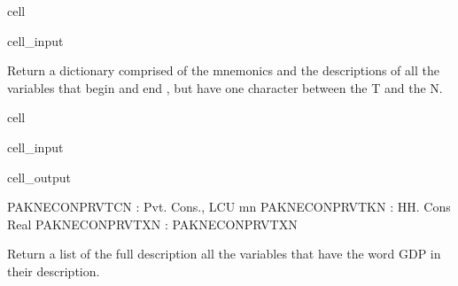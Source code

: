 \documentclass[letterpaper,10pt,english]{jupyterBook}
\begin{document}
\begin{sphinxuseclass}{cell}
\begin{sphinxVerbatimInput}
\begin{sphinxuseclass}{cell_input}
\begin{sphinxVerbatim}[commandchars=\\\{\}]


\end{sphinxVerbatim}

\end{sphinxuseclass}\end{sphinxVerbatimInput}

\end{sphinxuseclass}
\sphinxAtStartPar
Return a dictionary comprised of the mnemonics and the descriptions of all the variables that begin  and end , but have one character between the T and the N.

\begin{sphinxuseclass}{cell}\begin{sphinxVerbatimInput}

\begin{sphinxuseclass}{cell_input}
\begin{sphinxVerbatim}[commandchars=\\\{\}]
\PYG{p}{[}\PYG{p}{]}
\end{sphinxVerbatim}

\end{sphinxuseclass}\end{sphinxVerbatimInput}
\begin{sphinxVerbatimOutput}

\begin{sphinxuseclass}{cell_output}
\begin{sphinxVerbatim}[commandchars=\\\{\}]
PAKNECONPRVTCN : Pvt. Cons., LCU mn
PAKNECONPRVTKN : HH. Cons Real
PAKNECONPRVTXN : PAKNECONPRVTXN
\end{sphinxVerbatim}

\end{sphinxuseclass}\end{sphinxVerbatimOutput}

\end{sphinxuseclass}
\sphinxAtStartPar
Return a list of the full description  all the variables that have the word GDP in their description.
\end{document}
